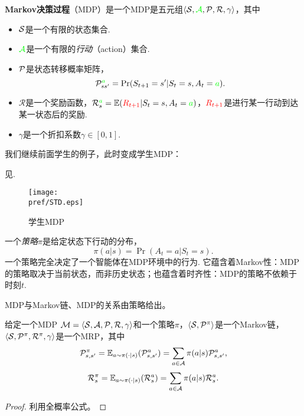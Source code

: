 \begin{definition}
\textbf{Markov决策过程}（MDP）是一个MDP是五元组$\langle\MS, \textcolor{green}{\mathcal A}, \P, \mathcal R, \gamma\rangle$，其中
\begin{itemize}
    \item $\MS$是一个有限的状态集合.
    \item $\textcolor{green}{\mathcal A}$是一个有限的\emph{行动}（action）集合.
    \item $\P$是状态转移概率矩阵，
    \[\P_{ss'}^{\textcolor{green}{a}} = \Pr(S_{t+1} = s' | S_t = s, A_t = \textcolor{green}{a}).\]
    \item $\mathcal R$是一个奖励函数，$\mathcal R_s^{\textcolor{green}{a}} = \E(\textcolor{red}{R_{t+1}} | S_t = s, A_t = \textcolor{green}{a})$，$\textcolor{red}{R_{t+1}}$是进行某一行动到达某一状态后的奖励.
    \item $\gamma$是一个折扣系数$\gamma\in[0,1]$.
\end{itemize}
\end{definition}


我们继续前面学生的例子，此时变成学生MDP：
\begin{example}[学生MDP]
见.
\begin{figure}
    \centering
    \texttt{[image: \\pref/STD.eps]}
    \caption{学生MDP}
    \label{fig:studentMDP}
\end{figure}
\end{example}

一个\emph{策略}$\pi$是给定状态下行动的分布，
    \[\pi(a|s) = \Pr(A_t=a | S_t = s).\]
一个策略完全决定了一个智能体在MDP环境中的行为. 它蕴含着Markov性：MDP的策略取决于当前状态，而非历史状态；也蕴含着时齐性：MDP的策略不依赖于时刻$t$.

MDP与Markov链、MDP的关系由策略给出。
\begin{proposition}
给定一个MDP $\M=\langle\MS,\mathcal A,\P,\mathcal R, \gamma\rangle$和一个策略$\pi$，$\langle \MS, \P^{\pi}\rangle$是一个Markov链，$\langle\MS,\P^{\pi}, \mathcal R^{\pi}, \gamma\rangle$是一个MRP，其中
\[\P_{s,s'}^{\pi} = \E_{a\sim\pi(\cdot|s)}(\P^a_{s,s'})=\sum_{a\in \mathcal A}\pi(a|s)\mathcal P_{s,s'}^{a},\]
    \[\mathcal R_s^{\pi} =\E_{a\sim\pi(\cdot|s)}(\mathcal R^a_s)=\sum_{a\in\mathcal A}\pi(a|s)\mathcal R_s^a.\]
\end{proposition}
\begin{proof}
利用全概率公式。
\end{proof}

